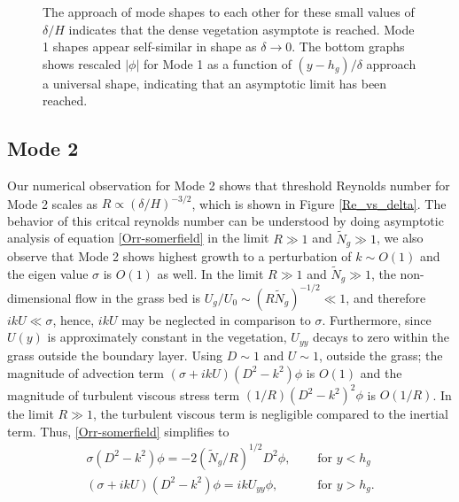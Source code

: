 \documentclass[12pt]{report}   %
\newcommand{\hg}{h_g}
\newcommand{\Rey}{{R}}
\newcommand{\Ndg}{\tilde{N}_g}
\begin{document}
\begin{figure}
{The approach of mode shapes to each other for these small values of $\delta/H$ indicates that the dense vegetation asymptote is reached. 
Mode 1 shapes appear self-similar in shape as $\delta\to 0$.
The bottom graphs shows rescaled $|\phi|$ for Mode 1 as a function of $(y-\hg)/\delta$ approach a universal shape, indicating that an asymptotic limit has been reached. 
}
\label{Asymptotic_mode}
\end{figure}

\subsection{Mode 2}
Our numerical observation for Mode 2 shows that threshold Reynolds number for Mode 2 scales as $\Rey \propto ({\delta}/{H})^{-3/2}$, which is shown in Figure \ref{Re_vs_delta}. The behavior of this critcal reynolds number can be understood by doing asymptotic analysis of equation \eqref{Orr-somerfield} in the limit $\Rey \gg 1$ and $\Ndg \gg 1$, we also observe that Mode 2 shows highest growth to a perturbation of $k \sim O(1)$ and the eigen value $\sigma$ is $O(1)$ as well. In the limit $\Rey \gg 1$ and $\Ndg \gg 1$, the non-dimensional flow in the grass bed is $U_g/U_0 \sim (\Rey \Ndg)^{-1/2} \ll 1$, and therefore $ikU \ll \sigma$, hence, $ikU$ may be neglected in comparison to $\sigma$. Furthermore, since $U(y)$ is approximately constant in the vegetation, $U_{yy}$ decays to zero within the grass outside the boundary layer. Using $D\sim 1$ and $U \sim 1$, outside the grass; the magnitude of advection term $\left(\sigma + i k U\right)\left(D^2- k^2\right) \phi$ is $O(1)$ and the 
magnitude of 
turbulent viscous stress term $(1/\Rey)\left(D^2-k^2\right)^2\phi$ is $O(1/R)$. In the limit $\Rey \gg 1$, the turbulent viscous term is negligible compared to the inertial term.
Thus, \eqref{Orr-somerfield} simplifies to 
\begin{subequations}
\begin{align}
\sigma\left(D^2-k^2\right)\phi = -2{(\Ndg/\Rey)^{1/2}}D^2\phi,  \quad &\text{ for } y<\hg  \label{eqn:mode2asympa} \\
\left(\sigma+ikU\right) \left(D^2-k^2\right)\phi =  ikU_{yy}\phi, \quad &\text{ for } y>\hg. \label{eqn:mode2asympb}
\end{align}
\label{eqn:mode2asymp}
\end{subequations}
\end{document}
